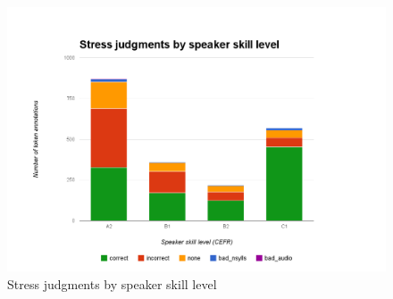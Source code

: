 			
			\begin{figure}[ht]
				\centering
				\includegraphics[width=\textwidth]{img/annotation/skillLevelBars}
				\caption{Stress judgments by speaker skill level }
				\label{fig:levelbars}
			\end{figure}
		
